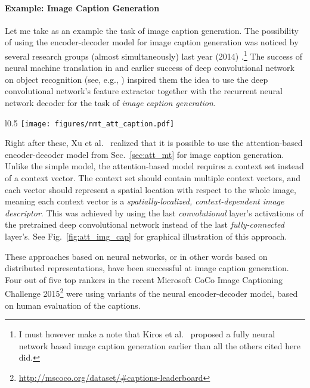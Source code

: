 \documentclass{report}
\begin{document}
\paragraph{Example: Image Caption Generation}

Let me take as an example the task of image caption generation.  The possibility
of using the encoder-decoder model for image caption generation was noticed by
several research groups (almost simultaneously) last year (2014)
\cite{Kiros-et-al-ICML2014,vinyals2014show,Karpathy+Li-arxiv2014,Mao+al-arxiv2014,Donahue-et-al-arxiv2014,Fang-et-al-arxiv2014,Chen+Zitnick-arxiv2014}.\footnote{
    I must however make a note that Kiros et al.~\cite{Kiros-et-al-ICML2014}
    proposed a fully neural network based image caption generation earlier than
    all the others cited here did.
} The success of neural machine translation in \cite{sutskever2014sequence} and
earlier success of deep convolutional network on object recognition (see, e.g.,
\cite{krizhevsky2012imagenet,simonyan2014very,szegedy2014going}) inspired them
the idea to use the deep convolutional network's feature extractor together with
the recurrent neural network decoder for the task of {\em image caption
generation}. 

\begin{wrapfigure}{l}{0.5\textwidth}
    \centering
    \texttt{[image: figures/nmt\_att\_caption.pdf]}
    \caption{Image caption generation with the attention-based
    encoder-decoder model \cite{xu2015show}.}
    \label{fig:att_img_cap}
\end{wrapfigure}

Right after these, Xu et al.~\cite{xu2015show} realized that it is possible to
use the attention-based encoder-decoder model from Sec.~\ref{sec:att_mt} for
image caption generation. Unlike the simple model, the attention-based model
requires a context set instead of a context vector. The context set should
contain multiple context vectors, and each vector should represent a spatial
location with respect to the whole image, meaning each context vector is a {\em
spatially-localized, context-dependent image descriptor}. This was achieved by
using the last {\em convolutional} layer's activations of the pretrained deep
convolutional network instead of the last {\em fully-connected} layer's. See
Fig.~\ref{fig:att_img_cap} for graphical illustration of this approach.

These approaches based on neural networks, or in other words based on
distributed representations, have been successful at image caption generation.
Four out of five top rankers in the recent Microsoft CoCo Image Captioning
Challenge 2015\footnote{
    \url{http://mscoco.org/dataset/\#captions-leaderboard}
} 
were using variants of the neural encoder-decoder model, based on human
evaluation of the captions. 
\end{document}
